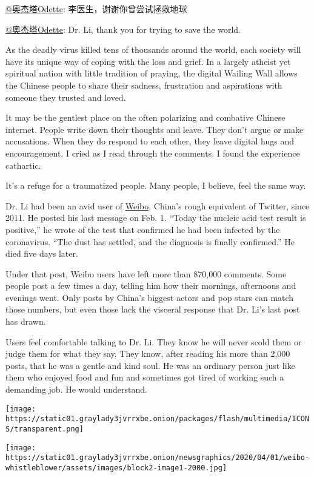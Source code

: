 \href{https://www.weibo.com/337281119}{@奥杰塔Odette}:
李医生，谢谢你曾尝试拯救地球

\href{https://www.weibo.com/337281119}{@奥杰塔Odette}: Dr. Li, thank you
for trying to save the world.

As the deadly virus killed tens of thousands around the world, each
society will have its unique way of coping with the loss and grief. In a
largely atheist yet spiritual nation with little tradition of praying,
the digital Wailing Wall allows the Chinese people to share their
sadness, frustration and aspirations with someone they trusted and
loved.

It may be the gentlest place on the often polarizing and combative
Chinese internet. People write down their thoughts and leave. They don't
argue or make accusations. When they do respond to each other, they
leave digital hugs and encouragement. I cried as I read through the
comments. I found the experience cathartic.

It's a refuge for a traumatized people. Many people, I believe, feel the
same way.

Dr. Li had been an avid user of
\href{https://www.nytimes3xbfgragh.onion/2018/11/19/fashion/china-social-media-weibo-wechat.html}{Weibo},
China's rough equivalent of Twitter, since 2011. He posted his last
message on Feb. 1. ``Today the nucleic acid test result is positive,''
he wrote of the test that confirmed he had been infected by the
coronavirus. ``The dust has settled, and the diagnosis is finally
confirmed.'' He died five days later.

Under that post, Weibo users have left more than 870,000 comments. Some
people post a few times a day, telling him how their mornings,
afternoons and evenings went. Only posts by China's biggest actors and
pop stars can match those numbers, but even those lack the visceral
response that Dr. Li's last post has drawn.

Users feel comfortable talking to Dr. Li. They know he will never scold
them or judge them for what they say. They know, after reading his more
than 2,000 posts, that he was a gentle and kind soul. He was an ordinary
person just like them who enjoyed food and fun and sometimes got tired
of working such a demanding job. He would understand.

\texttt{[image: https://static01.graylady3jvrrxbe.onion/packages/flash/multimedia/ICONS/transparent.png]}

\texttt{[image: https://static01.graylady3jvrrxbe.onion/newsgraphics/2020/04/01/weibo-whistleblower/assets/images/block2-image1-2000.jpg]}

